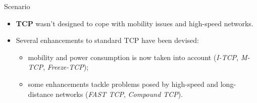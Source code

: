 \begin{frame}{Scenario}
	\begin{itemize}
		\item \textbf{TCP} wasn't designed to cope with mobility issues and high-speed networks.
		\item Several enhancements to standard TCP have been devised:
		\begin{itemize}
			\item mobility and power consumption is now taken into account (\textit{I-TCP}, \textit{M-TCP}, \textit{Freeze-TCP});
			\item some enhancements tackle problems posed by high-speed and long-distance networks
			      (\textit{FAST TCP}, \textit{Compound TCP}).
		\end{itemize}
	\end{itemize}
\end{frame}
